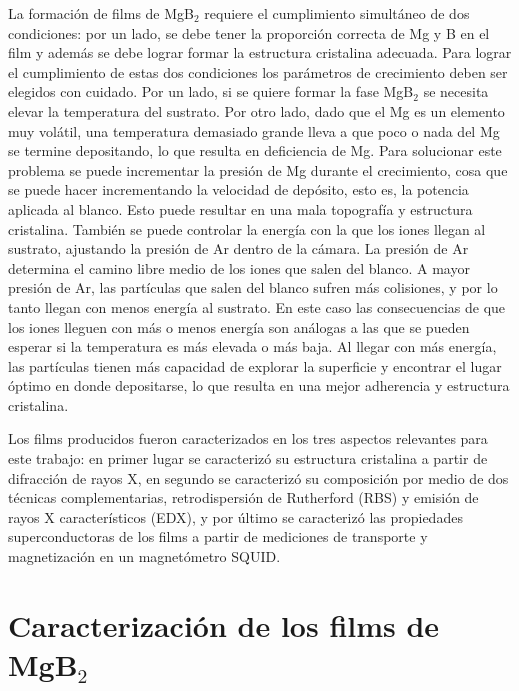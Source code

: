 La formación de films de MgB$_{2}$ requiere el cumplimiento simultáneo de dos condiciones: por un lado, se debe tener la proporción correcta de Mg y B en el film y además se debe lograr formar la estructura cristalina adecuada. Para lograr el cumplimiento de estas dos condiciones los pa\-rá\-me\-tros de crecimiento deben ser elegidos con cuidado. Por un lado, si se quiere formar la fase MgB$_{2}$ se necesita elevar la temperatura del sustrato\cite{Naito2004, Zhai1995, Xi2004}. Por otro lado, dado que el Mg es un elemento muy volátil, una temperatura demasiado grande lleva a que poco o nada del Mg se termine depositando, lo que resulta en deficiencia de Mg\cite{Xi2004}. Para solucionar este problema se puede incrementar la presión de Mg durante el cre\-ci\-mien\-to, cosa que se puede hacer incrementando la velocidad de depósito, esto es, la potencia aplicada al blanco. Esto puede resultar en una mala topografía y estructura cristalina. También se puede controlar la energía con la que los iones llegan al sustrato, ajustando la presión de Ar dentro de la cámara. La presión de Ar determina el camino libre medio de los iones que salen del blanco. A mayor presión de Ar, las partículas que salen del blanco sufren más colisiones, y por lo tanto llegan con menos energía al sustrato. En este caso las consecuencias de que los iones lleguen con más o menos energía son análogas a las que se pueden esperar si la temperatura es más elevada o más baja. Al llegar con más energía, las partículas tienen más capacidad de explorar la superficie y encontrar el lugar óptimo en donde depositarse, lo que resulta en una mejor adherencia y estructura cristalina.

Los films producidos fueron caracterizados en los tres aspectos relevantes para este trabajo: en primer lugar se caracterizó su estructura cristalina a partir de difracción de rayos X, en segundo se caracterizó su composición por medio de dos técnicas complementarias, retrodispersión de Rutherford (RBS) y emisión de rayos X característicos (EDX), y por último se caracterizó las propiedades superconductoras de los films a partir de mediciones de transporte y magnetización en un magnetómetro SQUID.

\section{Caracterización de los films de MgB$_2$}\label{S:caract}
